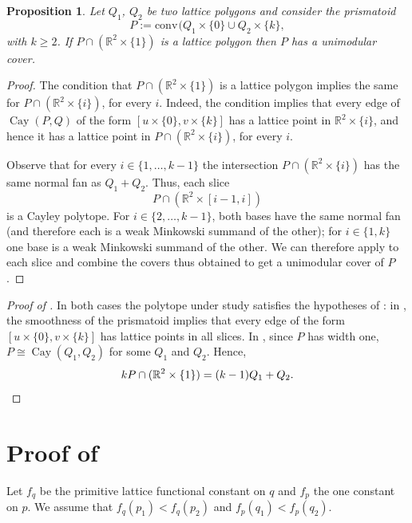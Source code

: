 \documentclass{amsart}
\theoremstyle{plain}
\newtheorem{proposition}[theorem]{Proposition}
\theoremstyle{definition}
\newcommand{\R}{ \ensuremath{\mathbb{R}}}
\newcommand{\conv}{\ensuremath{\mathrm{conv}}\hspace{1pt}}
\newcommand{\cayley}{\operatorname{Cay}}
\begin{document}
\begin{proposition}
\label{prop:prismatoid}
Let $Q_1$, $Q_2$ be two lattice polygons and consider the prismatoid 
\[
P:= \conv(Q_1\times\{0\} \cup Q_2 \times \{k\},
\]
with $k\ge 2$. 
If $P\cap(\R^2\times\{1\})$ is a lattice polygon then $P$ has a unimodular cover.
\end{proposition}

\begin{proof}
The condition that $P\cap(\R^2\times\{1\})$ is a lattice polygon implies the same for $P\cap(\R^2\times\{i\})$, for every $i$. 
Indeed, the condition implies that every edge of $\cayley(P,Q)$ of the form $[u\times \{0\}, v\times \{k\}]$ has a lattice point in $\R^2\times\{i\}$, and hence it has a lattice point in $P\cap(\R^2\times\{i\})$, for every $i$.

Observe that for every $i\in \{1,\dots,k-1\}$ the intersection $P\cap(\R^2\times\{i\})$ has the same normal fan as $Q_1+Q_2$. Thus, each slice
\[
P \cap (\R^2\times[i-1,i])
\]
is a Cayley polytope. For $i\in\{2,\dots,k-1\}$,  both bases have the same normal fan (and therefore each is a weak Minkowski summand of the other); for $i\in \{1,k\}$ one base is a weak Minkowski summand of the other. We can therefore apply  to each slice and combine the covers thus obtained to get a unimodular cover of $P$.
\end{proof}


\begin{proof}[Proof of ]
In both cases the polytope under study satisfies the hypotheses of : in , the smoothness of the prismatoid implies that every edge of the form $[u\times \{0\}, v\times \{k\}]$ has lattice points in all slices. In , since $P$ has width one, $P\cong \cayley(Q_1, Q_2)$ for some $Q_1$ and $Q_2$. Hence,
\[
kP \cap(\R^2\times\{1\}) = (k-1)Q_1 + Q_2.
\qedhere
\] 
\end{proof}




\section{Proof of }
\label{sec:the_lemma}
Let $f_q$ be the primitive lattice functional constant on $q$ and $f_p$ the one constant on $p$. We assume that $f_q(p_1) < f_q(p_2)$ and $f_p(q_1) < f_p(q_2)$.
\end{document}
